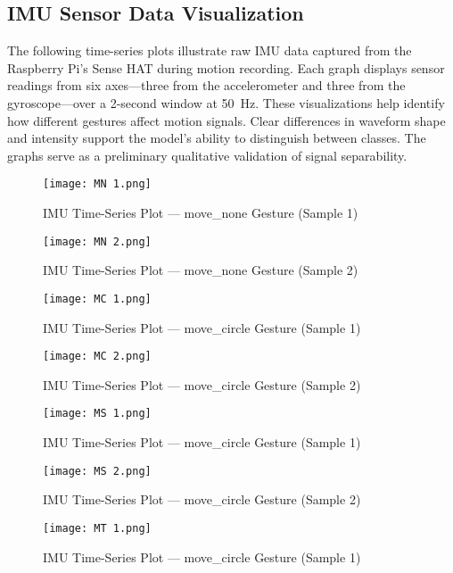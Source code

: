 \documentclass[a4paper,12pt]{article}
\begin{document}
\subsection{IMU Sensor Data Visualization}

The following time-series plots illustrate raw IMU data captured from the Raspberry
Pi’s Sense HAT during motion recording. Each graph displays sensor readings from
six axes—three from the accelerometer and three from the gyroscope—over a 2-second
window at 50~Hz. These visualizations help identify how different gestures affect motion
signals. Clear differences in waveform shape and intensity support the model’s ability to
distinguish between classes. The graphs serve as a preliminary qualitative validation of
signal separability.


\begin{figure}[H]
    \centering
    \texttt{[image: MN 1.png]}
    \caption{IMU Time-Series Plot — move\_none Gesture (Sample 1)}
\end{figure}

\begin{figure}[H]
    \centering
    \texttt{[image: MN 2.png]}
    \caption{IMU Time-Series Plot — move\_none Gesture (Sample 2)}
\end{figure}

\begin{figure}[H]
    \centering
    \texttt{[image: MC 1.png]}
    \caption{IMU Time-Series Plot — move\_circle Gesture (Sample 1)}
\end{figure}

\begin{figure}[H]
    \centering
    \texttt{[image: MC 2.png]}
    \caption{IMU Time-Series Plot — move\_circle Gesture (Sample 2)}
\end{figure}

\begin{figure}[H]
    \centering
    \texttt{[image: MS 1.png]}
    \caption{IMU Time-Series Plot — move\_circle Gesture (Sample 1)}
\end{figure}

\begin{figure}[H]
    \centering
    \texttt{[image: MS 2.png]}
    \caption{IMU Time-Series Plot — move\_circle Gesture (Sample 2)}
\end{figure}

\begin{figure}[H]
    \centering
    \texttt{[image: MT 1.png]}
    \caption{IMU Time-Series Plot — move\_circle Gesture (Sample 1)}
\end{figure}
\end{document}
